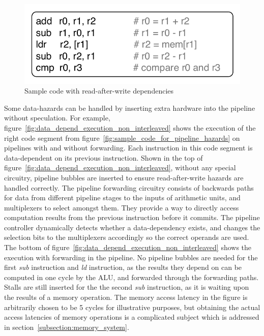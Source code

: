 \begin{figure}
  \vspace{-20pt}
  \begin{center}
    \includegraphics[scale=.65]{figs/sample_data_dependent_code}
  \end{center}
  \vspace{-20pt}
  \caption{Sample code with read-after-write dependencies}
  \label{fig:sample_data_dependent_code}
\end{figure}
Some data-hazards can be handled by inserting extra hardware into the pipeline without speculation.
For example, figure~\ref{fig:data_depend_execution_non_interleaved} shows the execution of the right code segment from figure~\ref{fig:sample_code_for_pipeline_hazards} on pipelines with and without forwarding.
Each instruction in this code segment is data-dependent on its previous instruction.   
Shown in the top of figure~\ref{fig:data_depend_execution_non_interleaved}, without any special circuitry, pipeline bubbles are inserted to ensure read-after-write hazards are handled correctly. 
The pipeline forwarding circuitry consists of backwards paths for data from different pipeline stages to the inputs of arithmetic units, and multiplexers to select amongst them. 
They provide a way to directly access computation results from the previous instruction before it commits. 
The pipeline controller dynamically detects whether a data-dependency exists, and changes the selection bits to the multiplexers accordingly so the correct operands are used.
The bottom of figure~\ref{fig:data_depend_execution_non_interleaved} shows the execution with forwarding in the pipeline.
No pipeline bubbles are needed for the first \emph{sub} instruction and \emph{ld} instruction, as the results they depend on can be computed in one cycle by the ALU, and forwarded through the forwarding paths.
Stalls are still inserted for the the second \emph{sub} instruction, as it is waiting upon the results of a memory operation. 
The memory access latency in the figure is arbitrarily chosen to be 5 cycles for illustrative purposes, but obtaining the actual access latencies of memory operations is a complicated subject which is addressed in section~\ref{subsection:memory_system}.
